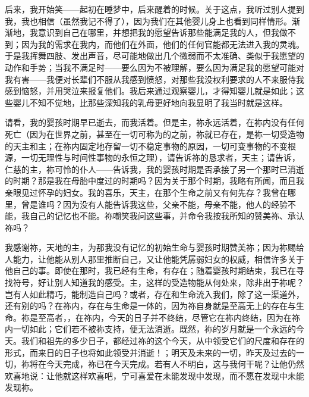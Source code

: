 后来，我开始笑——起初在睡梦中，后来醒着的时候。关于这点，我听过别人提到我，我也相信（虽然我记不得了），因为我们在其他婴儿身上也看到同样情形。渐渐地，我意识到自己在哪里，并想把我的愿望告诉那些能满足我的人，但我做不到；因为我的需求在我内，而他们在外面，他们的任何官能都无法进入我的灵魂。于是我挥舞四肢、发出声音，尽可能地做出几个微弱而不太准确、类似于我愿望的动作和手势；当我不满足时——要么因为不被理解，要么因为满足我的愿望可能对我有害——我便对长辈们不服从我感到愤怒，对那些我没权利要求的人不来服侍我感到恼怒，并用哭泣来报复他们。我后来通过观察婴儿，才得知婴儿就是如此；这些婴儿不知不觉地，比那些深知我的乳母更好地向我显明了我当时就是这样。\par

请看，我的婴孩时期早已逝去，而我活着。但是主，祢永远活着，在祢内没有任何死亡（因为在世界之前，甚至在一切可称为的之前，祢就已存在，是祢一切受造物的天主和主；在祢内固定地存留一切不稳定事物的原因，一切可变事物的不变根源，一切无理性与时间性事物的永恒之理），请告诉祢的恳求者，天主；请告诉，仁慈的主，祢可怜的仆人——告诉我，我的婴孩时期是否承接了另一个那时已消逝的时期？那是我在母胎中度过的时期吗？因为关于那个时期，我略有所闻，而且我亲眼见过怀孕的妇女。我的喜乐，天主，在那个生命之前又有何先存？我曾在哪里，曾是谁吗？因为没有人能告诉我这些，父亲不能，母亲不能，他人的经验不能，我自己的记忆也不能。祢嘲笑我问这些事，并命令我按我所知的赞美祢、承认祢吗？\par

我感谢祢，天地的主，为那我没有记忆的初始生命与婴孩时期赞美祢；因为祢赐给人能力，让他能从别人那里推断自己，又让他能凭孱弱妇女的权威，相信许多关于他自己的事。即使在那时，我已经有生命，有存在；随着婴孩时期结束，我已在寻找符号，好让别人知道我的感受。主，这样的受造物能从何处来，除非出于祢呢？岂有人如此精巧，能制造自己吗？或者，存在和生命流入我们，除了这一渠道外，还有别的吗？在祢内，存在与生命是一体的，因为祢自身就是至高无上的存在与生命。祢是至高者，，在祢内，今天的日子并不终结，尽管它在祢内终结，因为在祢内一切如此；它们若不被祢支持，便无法消逝。既然，祢的岁月就是一个永远的今天。我们和祖先的多少日子，都经过祢的这个今天，从中领受它们的尺度和存在的形式，而来日的日子也将如此领受并消逝！；明天及未来的一切，昨天及过去的一切，祢将在今天完成，祢已在今天完成。若有人不明白，这与我何干呢？让他仍然欢喜地说：让他就这样欢喜吧，宁可喜爱在未能发现中发现，而不愿在发现中未能发现祢。\par


